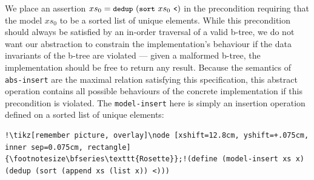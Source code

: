 We place an assertion $xs_0 = \texttt{\small dedup}\ (\texttt{\small sort}\ xs_0\ \texttt{\small<})$ in the precondition requiring that the model $xs_0$ to be a sorted list of unique elements. 
While this precondition should always be satisfied by an in-order traversal of a valid b-tree, we do not want our abstraction to constrain the implementation's behaviour if the data invariants of the b-tree are violated --- given a malformed b-tree, the 
implementation should be free to return any result. Because the semantics of \lstinline{abs-insert} are the maximal relation satisfying this specification, this abstract operation contains all possible behaviours of the concrete implementation if this precondition is violated. The \lstinline|model-insert| here is simply an insertion operation defined on a sorted list of unique elements:
\begin{lstlisting}[language=racket, style=boxed]
!\tikz[remember picture, overlay]\node [xshift=12.8cm, yshift=+.075cm, inner sep=0.075cm, rectangle] {\footnotesize\bfseries\texttt{Rosette}};!(define (model-insert xs x) (dedup (sort (append xs (list x)) <)))
\end{lstlisting}

